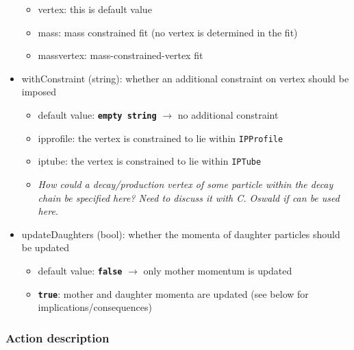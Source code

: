 \begin{itemize}
 \begin{itemize}
  \item {\redtt vertex}: this is default value
  \item {\redtt mass}: mass constrained fit (no vertex is determined in the fit)
  \item {\redtt massvertex}: mass-constrained-vertex fit
 \end{itemize}
 \item {\bluett withConstraint} (string): whether an additional constraint on vertex should be imposed
 \begin{itemize}
  \item default value: {\color{red}\tt \bf empty string} $\rightarrow$ no additional constraint
  \item {\redtt ipprofile}: the vertex is constrained to lie within {\tt IPProfile}
  \item {\redtt iptube}: the vertex is constrained to lie within {\tt IPTube}
  \item {\it How could a decay/production vertex of some particle within the decay chain be specified here? Need to discuss it with C. Oswald 
  if \decayString can be used here.}
 \end{itemize}
 \item {\bluett updateDaughters} (bool): whether the momenta of daughter particles should be updated
 \begin{itemize}
  \item default value: {\color{red}\tt \bf false} $\rightarrow$ only mother momentum is updated
  \item {\color{red}\tt \bf true}: mother and daughter momenta are updated (see below for implications/consequences)
 \end{itemize}  
\end{itemize}

\subsubsection{Action description}

